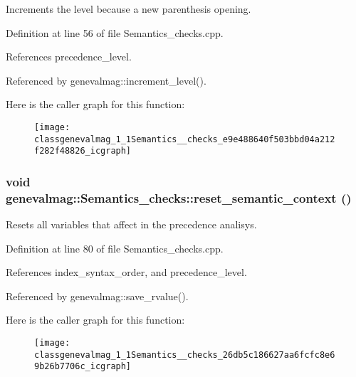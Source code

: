 Increments the level because a new parenthesis opening. 

Definition at line 56 of file Semantics\_\-checks.cpp.

References precedence\_\-level.

Referenced by genevalmag::increment\_\-level().

Here is the caller graph for this function:\nopagebreak
\begin{figure}[H]
\begin{center}
\leavevmode
\texttt{[image: classgenevalmag\_1\_1Semantics\_\_checks\_e9e488640f503bbd04a212f282f48826\_icgraph]}
\end{center}
\end{figure}
\hypertarget{classgenevalmag_1_1Semantics__checks_26db5c186627aa6fcfc8e69b26b7706c}{
\subsubsection[{reset\_\-semantic\_\-context}]{\setlength{\rightskip}{0pt plus 5cm}void genevalmag::Semantics\_\-checks::reset\_\-semantic\_\-context ()}}
\label{classgenevalmag_1_1Semantics__checks_26db5c186627aa6fcfc8e69b26b7706c}


Resets all variables that affect in the precedence analisys. 

Definition at line 80 of file Semantics\_\-checks.cpp.

References index\_\-syntax\_\-order, and precedence\_\-level.

Referenced by genevalmag::save\_\-rvalue().

Here is the caller graph for this function:\nopagebreak
\begin{figure}[H]
\begin{center}
\leavevmode
\texttt{[image: classgenevalmag\_1\_1Semantics\_\_checks\_26db5c186627aa6fcfc8e69b26b7706c\_icgraph]}
\end{center}
\end{figure}


